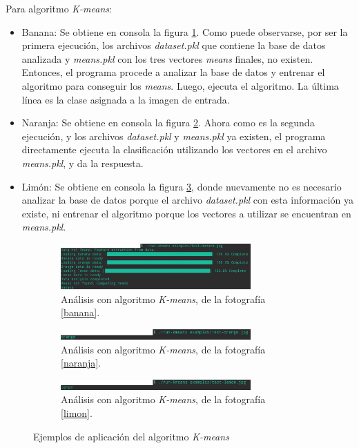 \documentclass[10pt,a4paper]{article}
\begin{document}
Para algoritmo \textit{K-means}:
\begin{itemize}
\item Banana: Se obtiene en consola la figura \ref{kmeans-banana}. Como puede observarse, por ser la primera ejecución, los archivos \textit{dataset.pkl} que contiene la base de datos analizada y \textit{means.pkl} con los tres vectores \textit{means} finales, no existen. Entonces, el programa procede a analizar la base de datos y entrenar el algoritmo para conseguir los \textit{means}. Luego, ejecuta el algoritmo. La última línea es la clase asignada a la imagen de entrada.

\item Naranja: Se obtiene en consola la figura \ref{kmeans-naranja}. Ahora como es la segunda ejecución, y los archivos \textit{dataset.pkl} y \textit{means.pkl} ya existen, el programa directamente ejecuta la clasificación utilizando los vectores en el archivo \textit{means.pkl}, y da la respuesta.

\item Limón: Se obtiene en consola la figura \ref{kmeans-limon}, donde nuevamente no es necesario analizar la base de datos porque el archivo \textit{dataset.pkl} con esta información ya existe, ni entrenar el algoritmo porque los vectores a utilizar se encuentran en \textit{means.pkl}.

\end{itemize}

\begin{figure}[h]
    \centering
    \begin{subfigure}[b]{\textwidth}
        \centering
		\includegraphics[width=0.8\textwidth]{imgs/kmeans-banana.png}
		\caption{Análisis con algoritmo \textit{K-means}, de la fotografía \ref{banana}.}
		\label{kmeans-banana}
    \end{subfigure}
    \begin{subfigure}[b]{\textwidth}
    	\centering
        \includegraphics[width=0.8\textwidth]{imgs/kmeans-orange.png}
		\caption{Análisis con algoritmo \textit{K-means}, de la fotografía \ref{naranja}.}
		\label{kmeans-naranja}
    \end{subfigure}
    \begin{subfigure}[b]{\textwidth}
        \centering
		\includegraphics[width=0.8\textwidth]{imgs/kmeans-lemon.png}
		\caption{Análisis con algoritmo \textit{K-means}, de la fotografía \ref{limon}.}
		\label{kmeans-limon}
    \end{subfigure}
    \caption{Ejemplos de aplicación del algoritmo \textit{K-means}}\label{kmeans-aplicacion}
\end{figure}
\end{document}
